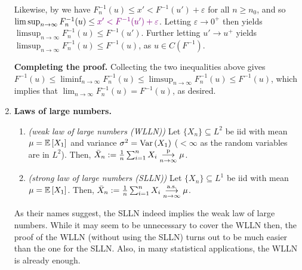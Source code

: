 \begin{enumerate}
\begin{pf}
Likewise, by  we have \(F_n^{-1}(u)\le
x'<F^{-1}(u')+\varepsilon\) for all \(n\ge n_0\), and so \(\limsup_{n\to
\infty}F_n^{-1}(u)\le \vc{x'<F^{-1}(u')+\varepsilon}\). Letting
\(\varepsilon\to 0^{+}\) then yields \(\limsup_{n\to \infty}F_n^{-1}(u)\le
F^{-1}(u')\). Further letting \(u'\to u^{+}\) yields \(\limsup_{n\to
\infty}F_n^{-1}(u)\le F^{-1}(u)\), as \(u\in C(F^{-1})\).

\textbf{Completing the proof.} Collecting the two inequalities above gives
\(F^{-1}(u)\le \liminf_{n\to \infty}F_n^{-1}(u)\le \limsup_{n\to \infty}F_n^{-1}(u)
\le F^{-1}(u)\), which implies that \(\lim_{n\to\infty}F_n^{-1}(u)=F^{-1}(u)\),
as desired.
\end{pf}
\item \textbf{Laws of large numbers.}
\begin{theorem}
\label{thm:lln}\hfill
\begin{enumerate}
\item \emph{(weak law of large numbers (WLLN))} Let \(\{X_n\}\subseteq L^2\) be iid
with mean \(\mu=\mathbb{E}\left[X_1\right]\) and variance \(\sigma^2=\operatorname{Var}\left(X_1\right)\) (\(<\infty\)
as the random variables are in \(L^2\)). Then,
\(\bar{X}_n:=\frac{1}{n}\sum_{i=1}^{n}X_i\underset{n\to\infty}{\overset{\text{p}}{\longrightarrow}} \mu\).
\item \emph{(strong law of large numbers (SLLN))}
Let \(\{X_n\}\subseteq L^1\) be iid with mean \(\mu=\mathbb{E}\left[X_1\right]\). Then,
\(\bar{X}_n:=\frac{1}{n}\sum_{i=1}^{n}X_i\underset{n\to\infty}{\overset{\text{a.s.}}{\longrightarrow}} \mu\).
\end{enumerate}
\end{theorem}
\begin{note}
As their names suggest, the SLLN indeed implies the weak law of large numbers.
While it may seem to be unnecessary to cover the WLLN then, the proof of the
WLLN (without using the SLLN) turns out to be much easier than the one for the
SLLN. Also, in many statistical applications, the WLLN is already enough.
\end{note}


\end{enumerate}

